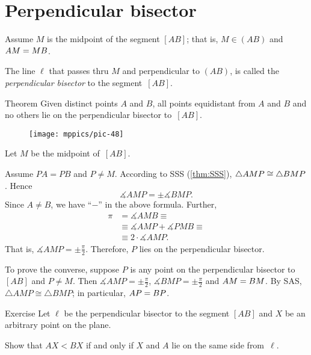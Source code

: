 \section*{Perpendicular bisector}

Assume $M$ is the midpoint of the segment $[AB]$;
that is, $M\in(A B)$ and $A M \z= M B$.

The line $\ell$ that passes thru $M$ and perpendicular to $(AB)$,
is called the \emph{perpendicular bisector} to the segment~$[AB]$. 

\begin{thm}[\abs]{Theorem}\label{thm:perp-bisect}
Given distinct points $A$ and $B$,
all points equidistant from $A$ and $B$ and no
others lie on the perpendicular bisector to~$[A B]$.
\end{thm}

\begin{wrapfigure}{o}{34mm}
\centering
\texttt{[image: mppics/pic-48]}
\end{wrapfigure}

 Let $M$ be the midpoint of~$[A B]$.

Assume $P A= P B$ and $P\ne M$.
According to SSS (\ref{thm:SSS}),
$\triangle A M P \z\cong\triangle B M P$.
Hence 
$$\measuredangle A M P=\pm \measuredangle B M P.$$  
Since $A\not=B$, we have ``$-$'' in the above formula.
Further,
\begin{align*}
\pi
&=
\measuredangle A M B
\equiv
\\
&\equiv\measuredangle A M P+\measuredangle P M B
\equiv
\\
&\equiv
2\cdot \measuredangle A M P.
\end{align*}
That is, $\measuredangle A M P
=
\pm
\tfrac\pi2$. 
Therefore, $P$ lies on the perpendicular bisector.


To prove the converse, 
suppose $P$ 
is any point on the perpendicular bisector to $[A B]$ and $P\ne M$.
Then $\measuredangle A M P=\pm \tfrac\pi2$, 
$\measuredangle B M P=\pm \tfrac\pi2$ and
$A M\z=B M$.
By SAS, $\triangle A M P\cong \triangle B M P$;
in particular, $A P\z= B P$.\qeds


\begin{thm}{Exercise}\label{ex:pbisec-side}
Let $\ell$ be the perpendicular bisector to the segment $[A B]$ and $X$ be an arbitrary point on the plane.

Show that 
$AX<BX$ if and only if $X$ and $A$ lie on the same side from~$\ell$.
\end{thm}

